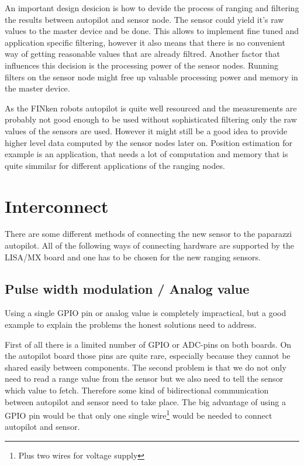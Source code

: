 An important design desicion is how to devide the process of ranging and filtering the results between autopilot and sensor node.
The sensor could yield it's raw values to the master device and be done.
This allows to implement fine tuned and application specific filtering, however it also means that there is no convenient way of getting reasonable values that are already filtred.
Another factor that influences this decision is the processing power of the sensor nodes.
Running filters on the sensor node might free up valuable processing power and memory in the master device.

As the FINken robots autopilot is quite well resourced and the measurements are probably not good enough to be used without sophisticated filtering only the raw values of the sensors are used.
However it might still be a good idea to provide higher level data computed by the sensor nodes later on.
Position estimation for example is an application, that needs a lot of computation and memory that is quite simmilar for different applications of the ranging nodes.

\section{Interconnect}
There are some different methods of connecting the new sensor to the paparazzi autopilot.
All of the following ways of connecting hardware are supported by the LISA/MX board and one has to be chosen for the new ranging sensors.

\subsection{Pulse width modulation / Analog value}
Using a single GPIO pin or analog value is completely impractical, but a good example to explain the problems the honest solutions need to address.

First of all there is a limited number of GPIO or ADC-pins on both boards.
On the autopilot board those pins are quite rare, especially because they cannot be shared easily between components.
The second problem is that we do not only need to read a range value from the sensor but we also need to tell the sensor which value to fetch.
Therefore some kind of bidirectional communication between autopilot and sensor need to take place.
The big advantage of using a GPIO pin would be that only one single wire\footnote{Plus two wires for voltage supply} would be needed to connect autopilot and sensor.

